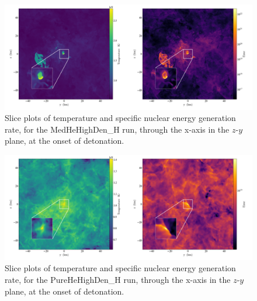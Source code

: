 \begin{center}
\begin{figure}[!htb]

\includegraphics[width=1.0\textwidth]{combined_512_10e6_0.25_new.png}
\centering
\caption[Slice plots of temperature and specific nuclear energy generation rate, for the MedHeHighDen\_H run]{Slice plots of temperature and specific nuclear energy generation rate, for the MedHeHighDen\_H run, through the x-axis in the $z$-$y$ plane, at the onset of detonation.}
\label {fig:temp_enuc}

\end{figure}
\end{center}

\begin{center}
\begin{figure}[!htb]

\includegraphics[width=1.0\textwidth]{combined_512_10e6_1.0_new.png}
\centering
\caption[Slice plots of temperature and specific nuclear energy generation rate, for the PureHeHighDen\_H run]{Slice plots of temperature and specific nuclear energy generation rate, for the PureHeHighDen\_H run, through the x-axis in the $z$-$y$ plane, at the onset of detonation.}
\label {fig:temp_enuc}

\end{figure}
\end{center}


